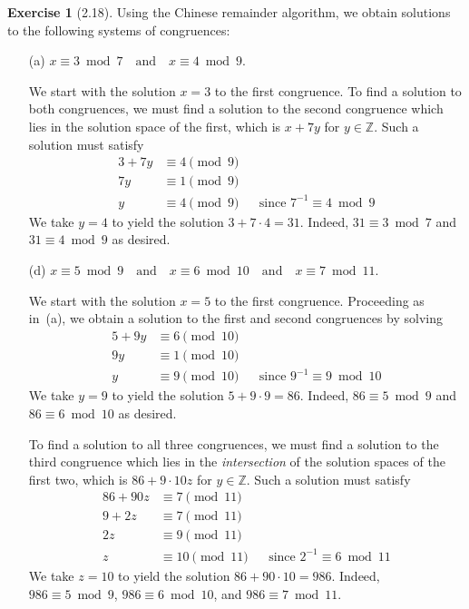 \documentclass[letterpaper,12pt]{article}
\newcommand{\Z}{\mathbb{Z}}
\theoremstyle{definition}
\newtheorem*{exer}{Exercise}
\begin{document}
\begin{exer}[2.18]
Using the Chinese remainder algorithm, we obtain solutions to the following systems of congruences:
\begin{enumerate}[itemsep=0pt]
\item[(a)] \(x\equiv 3\bmod 7\quad\text{and}\quad x\equiv 4\bmod 9\).

We start with the solution \(x=3\) to the first congruence. To find a solution to both congruences, we must find a solution to the second congruence which lies in the solution space of the first, which is \(x+7y\) for \(y\in\Z\). Such a solution must satisfy
\begin{align*}
3+7y&\equiv 4\pmod 9&&\\
7y&\equiv 1\pmod 9&&\\
y&\equiv 4\pmod 9&&\text{since }7^{-1}\equiv 4\bmod 9
\end{align*}
We take \(y=4\) to yield the solution \(3+7\cdot 4=31\). Indeed, \(31\equiv 3\bmod 7\) and \(31\equiv 4\bmod 9\) as desired.

\item[(d)] \(x\equiv 5\bmod 9\quad\text{and}\quad x\equiv 6\bmod{10}\quad\text{and}\quad x\equiv 7\bmod{11}\).

We start with the solution \(x=5\) to the first congruence. Proceeding as in~(a), we obtain a solution to the first and second congruences by solving
\begin{align*}
5+9y&\equiv 6\pmod{10}&&\\
9y&\equiv 1\pmod{10}&&\\
y&\equiv 9\pmod{10}&&\text{since }9^{-1}\equiv 9\bmod{10}
\end{align*}
We take \(y=9\) to yield the solution \(5+9\cdot 9=86\). Indeed, \(86\equiv 5\bmod 9\) and \(86\equiv 6\bmod{10}\) as desired.

To find a solution to all three congruences, we must find a solution to the third congruence which lies in the \emph{intersection} of the solution spaces of the first two, which is \(86+9\cdot 10z\) for \(y\in\Z\). Such a solution must satisfy
\begin{align*}
86+90z&\equiv 7\pmod{11}&&\\
9+2z&\equiv 7\pmod{11}&&\\
2z&\equiv 9\pmod{11}&&\\
z&\equiv 10\pmod{11}&&\text{since }2^{-1}\equiv 6\bmod{11}
\end{align*}
We take \(z=10\) to yield the solution \(86+90\cdot 10=986\). Indeed, \(986\equiv 5\bmod 9\), \(986\equiv 6\bmod 10\), and \(986\equiv 7\bmod 11\).
\end{enumerate}
\end{exer}
\end{document}
